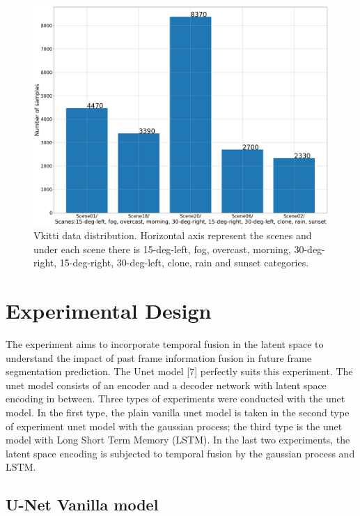 	\begin{figure}
		\centering
		\includegraphics[width=14cm]{images/vkitti_scanes_samples.png}
		\caption{Vkitti data distribution. Horizontal axis represent the scenes and under each scene there is 15-deg-left, fog, overcast, morning, 30-deg-right, 15-deg-right, 30-deg-left, clone, rain and sunset categories.}
		\label{fig:scannet_vkitti}
	\end{figure}	
	
    \section{Experimental Design}
    
    The experiment aims to incorporate temporal fusion in the latent space to understand the impact of past frame information fusion in future frame segmentation prediction. The Unet model [7] perfectly suits this experiment. The unet model consists of an encoder and a decoder network with latent space encoding in between. Three types of experiments were conducted with the unet model. In the first type, the plain vanilla unet model is taken in the second type of experiment unet model with the gaussian process; the third type is the unet model with Long Short Term Memory (LSTM). In the last two experiments, the latent space encoding is subjected to temporal fusion by the gaussian process and LSTM.   
    
    \subsection{U-Net Vanilla model}
    
